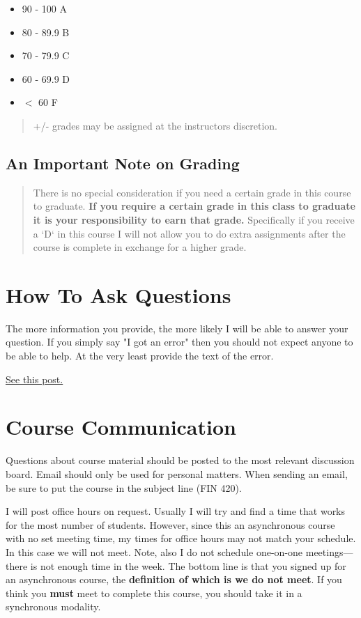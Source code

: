 \documentclass[11pt]{article}
\begin{document}
\begin{itemize}
\item 90 - 100 A
\item 80 - 89.9 B
\item 70 - 79.9 C
\item 60 - 69.9 D
\item \(<\) 60 F
\end{itemize}

\begin{quote}
+/- grades may be assigned at the instructors discretion.
\end{quote}
\subsection{An Important Note on Grading}
\label{sec:orgcf5f493}

\begin{quote}
There is no special consideration if you need a certain grade in this course to graduate.  \textbf{\textbf{If you require a certain grade in this class to graduate it is your responsibility to earn that grade.}} Specifically if you receive a `D` in this course I will not allow you to do extra assignments after the course is complete in exchange for a higher grade. 
\end{quote}
\section{How To Ask Questions}
\label{sec:orgaa2e391}

The more information you provide, the more likely I will be able to answer your question.  If you simply say "I got an error" then you should not expect anyone to be able to help.  At the very least provide the text of the error.

\href{https://stackoverflow.com/help/how-to-ask}{See this post.}  
\section{Course Communication}
\label{sec:org921a46a}

Questions about course material should be posted to the most relevant discussion board.  Email should only be used for personal matters.  When sending an email, be sure to put the course in the subject line (FIN 420). 

I will post office hours on request. Usually I will try and find a time that works for the most number of students.  However, since this an asynchronous course with no set meeting time, my times for office hours may not match your schedule.  In this case we will not meet.  Note, also I do not schedule one-on-one meetings---there is not enough time in the week.  The bottom line is that you signed up for an asynchronous course, the \textbf{\textbf{definition of which is we do not meet}}.  If you think you \textbf{must} meet to complete this course, you should take it in a synchronous modality. 
\end{document}
